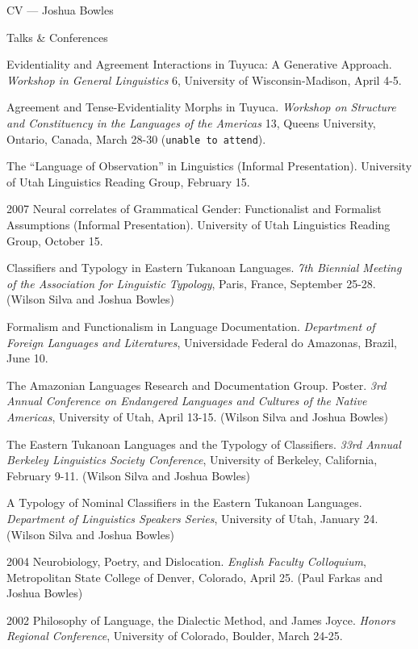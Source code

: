 \begin{cv}{CV --- Joshua Bowles}
\begin{cvlist}{Talks \& Conferences}
\item Evidentiality and Agreement Interactions in Tuyuca: A Generative Approach.
\emph{Workshop in General Linguistics} 6, University of Wisconsin-Madison, April 4-5.

\item Agreement and Tense-Evidentiality Morphs in Tuyuca. \emph{Workshop on Structure
and Constituency in the Languages of the Americas} 13, Queens University,
Ontario, Canada, March 28-30 (\texttt{unable to attend}).

\item The ``Language of Observation'' in Linguistics (Informal Presentation). University of Utah
Linguistics Reading Group, February 15.
\item[2007] Neural correlates of Grammatical Gender: Functionalist and Formalist
Assumptions (Informal Presentation). University of Utah Linguistics Reading
Group, October 15.

\item Classifiers and Typology in Eastern Tukanoan Languages. \emph{7th Biennial Meeting of the
Association for Linguistic Typology}, Paris, France, September 25-28.
(Wilson Silva and Joshua Bowles)

\item Formalism and Functionalism in Language Documentation. \emph{Department of
Foreign Languages and Literatures}, Universidade Federal do Amazonas, Brazil,
June 10.

\item The Amazonian Languages Research and Documentation Group. Poster. \emph{3rd
Annual Conference on Endangered Languages and Cultures of the Native
Americas}, University of Utah, April 13-15.
(Wilson Silva and Joshua Bowles)

\item The Eastern Tukanoan Languages and the Typology of Classifiers. \emph{33rd Annual Berkeley
Linguistics Society Conference}, University of Berkeley, California,
February 9-11. (Wilson Silva and Joshua Bowles)

\item A Typology of Nominal Classifiers in the Eastern Tukanoan Languages.
\emph{Department of Linguistics Speakers Series}, University of Utah, January 24. (Wilson Silva and
Joshua Bowles)
\item[2004] Neurobiology, Poetry, and Dislocation. \emph{English Faculty Colloquium}, Metropolitan
State College of Denver, Colorado, April 25. (Paul Farkas and Joshua Bowles)
\item[2002] Philosophy of Language, the Dialectic Method, and James Joyce. \emph{Honors Regional
Conference}, University of Colorado, Boulder, March 24-25.
\end{cvlist}


\end{cv}

